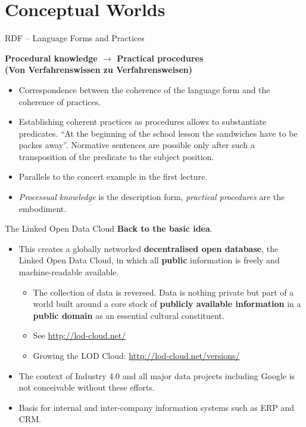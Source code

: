 \documentclass{beamer}
\title{Modelling Sustainable Systems\\ and Semantic Web\\[6pt]
  Modelling of Conceptual Worlds
  \vskip1em}
\subtitle{Lecture in the Module 10-202-2312\\ for Master Computer Science}
\author{Prof. Dr. Hans-Gert Gräbe\\
\url{http://www.informatik.uni-leipzig.de/~graebe}}
\date{June 2022}
\newcommand{\ueberschrift}[1]{\begin{center}\bf #1\end{center}}
\begin{document}
{
\begin{frame}
  \titlepage
\end{frame}}

\section{Conceptual Worlds}
\begin{frame}{RDF -- Language Forms and Practices}

\ueberschrift{Procedural knowledge $\to$ Practical procedures\\ (Von
  Verfahrenswissen zu Verfahrensweisen)} 
\begin{itemize}
\item Correspondence between the coherence of the language form and the
  coherence of practices.
\item Establishing coherent practices as procedures allows to substantiate
  predicates.  “At the beginning of the school lesson the sandwiches have to
  be packes away”.  Normative sentences are possible only after such a
  transposition of the predicate to the subject position.
\item Parallels to the concert example in the first lecture.
\item \emph{Processual knowledge} is the description form, \emph{practical
  procedures} are the embodiment.
  \end{itemize}
\end{frame}

\begin{frame}{The Linked Open Data Cloud}
\textbf{Back to the basic idea}.
\begin{itemize}
\item This creates a globally networked \textbf{decentralised open database},
  the Linked Open Data Cloud, in which all \textbf{public} information is
  freely and machine-readable available.
  \begin{itemize}
  \item The collection of data is reversed. Data is nothing private but part
    of a world built around a core stock of \textbf{publicly available
      information} in a \textbf{public domain} as an essential cultural 
    constituent.
  \item See \url{http://lod-cloud.net/}
  \item Growing the LOD Cloud: \url{http://lod-cloud.net/versions/}
  \end{itemize}
\item The context of Industry 4.0 and all major data projects including Google
  is not conceivable without these efforts.
\item Basis for internal and inter-company information systems such as ERP and
  CRM.
\end{itemize}
\end{frame}
\end{document}
